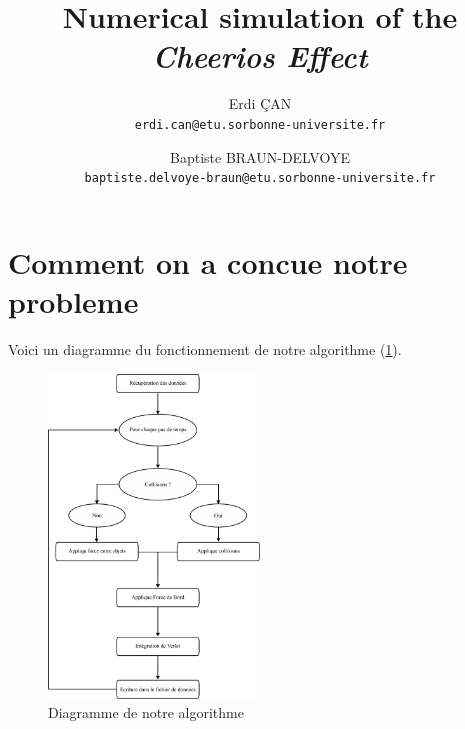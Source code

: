 \documentclass[a4paper, 11pt, oneside]{article} %
\author{
  Erdi ÇAN\\
  \texttt{erdi.can@etu.sorbonne-universite.fr}
  \and
  Baptiste BRAUN-DELVOYE\\
  \texttt{baptiste.delvoye-braun@etu.sorbonne-universite.fr}
}
\title{Numerical simulation of the \textit{Cheerios Effect}}
\begin{document}
 
\usetikzlibrary{patterns,patterns.meta}

\maketitle

\tableofcontents
\listoffigures
\listoftables



      
\section{Comment on a concue notre probleme}
    Voici un diagramme du fonctionnement de notre algorithme (\ref{diag:algorithme}).
    \begin{figure}[!htb]
        \centering
        \includegraphics[width=0.5\textwidth]{Diagramme.pdf}
        \caption{Diagramme de notre algorithme}
        \label{diag:algorithme}
    \end{figure} 
\end{document}
